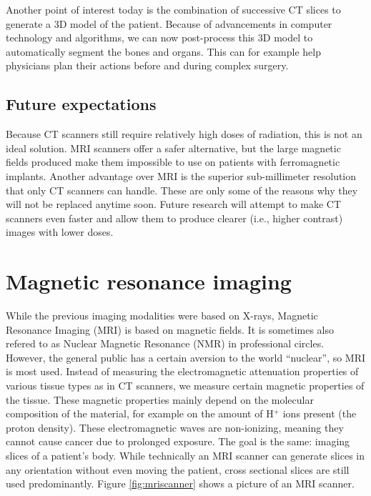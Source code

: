 Another point of interest today is the combination of successive CT slices to
generate a 3D model of the patient. Because of advancements in computer
technology and algorithms, we can now post-process this 3D model to
automatically segment the bones and organs. This can for example help physicians
plan their actions before and during complex surgery. %

\subsection{Future expectations}
Because CT scanners still require relatively high doses of radiation, this is
not an ideal solution. MRI scanners offer a safer alternative, but the large
magnetic fields produced make them impossible to use on patients with ferromagnetic
implants. Another advantage over MRI is the superior sub-millimeter resolution
that only CT scanners can handle. These are only some of the reasons why they
will not be replaced anytime soon. Future research will attempt to make CT scanners
even faster and allow them to produce clearer (i.e., higher contrast) images
with lower doses.

\section{Magnetic resonance imaging}
While the previous imaging modalities were based on X-rays, Magnetic Resonance
Imaging (MRI) is based on magnetic fields. It is sometimes also refered to as
Nuclear Magnetic Resonance (NMR) in professional circles. However, the general
public has a certain aversion to the world ``nuclear'', so MRI is most used.
Instead of measuring the electromagnetic attenuation properties of various
tissue types as in CT scanners, we measure certain magnetic properties of the
tissue. These magnetic properties mainly depend on the molecular composition of
the material, for example on the amount of H$^+$ ions present (the proton
density). These electromagnetic waves are non-ionizing, meaning they cannot
cause cancer due to prolonged exposure. The goal is the same: imaging slices of
a patient's body. While technically an MRI scanner can generate slices in any
orientation without even moving the patient, cross sectional slices are still
used predominantly. Figure \ref{fig:mriscanner} shows a picture of an MRI
scanner.


